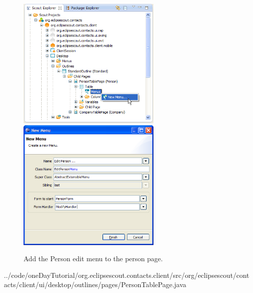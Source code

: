 \documentclass[a4paper,10pt,twoside]{book}
\begin{document}
\begin{figure}
\includegraphics[width=7cm]{new_menu_editperson_contextmenu.png} \hspace{5mm}
\includegraphics[width=7cm]{new_menu_editperson.png}
\caption{Add the Person edit menu to the person page.}
\end{figure}


{../code/oneDayTutorial/org.eclipsescout.contacts.client/src/org/eclipsescout/contacts/client/ui/desktop/outlines/pages/PersonTablePage.java}
\end{document}
